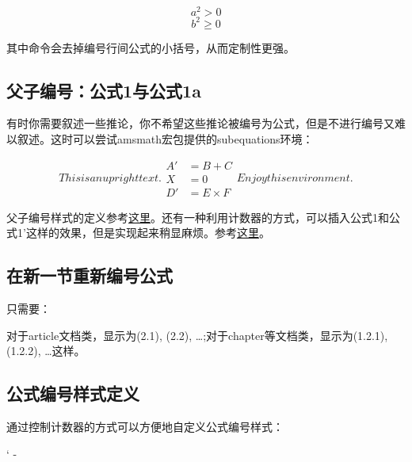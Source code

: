 \begin{codeshow}
\[a^2>0 \tag{$\star$}\]
\begin{equation}
b^2 \geqslant 0
\tag*{[Axiom]}
\end{equation}
\end{codeshow}

其中\latexline{\\tag*}命令会去掉编号行间公式的小括号，从而定制性更强。

\subsection{父子编号：公式1与公式1a}
有时你需要叙述一些推论，你不希望这些推论被编号为公式，但是不进行编号又难以叙述。这时可以尝试amsmath宏包提供的subequations环境：

\begin{codeshow}
\begin{subequations}
This is an upright text.
\begin{align}
A' &=B+C \\
X &=0 \nonumber \\
D' &=E \times F
\end{align}
Enjoy this environment.
\end{subequations}
\end{codeshow}

父子编号样式的定义参考\hyperref[code:parenteqnum]{这里}。还有一种利用计数器的方式，可以插入公式1和公式1'这样的效果，但是实现起来稍显麻烦。参考\hyperref[code:eq1plus]{这里}。

\subsection{在新一节重新编号公式}
只需要：
\begin{latex}{}
\end{latex}

对于article文档类，显示为(2.1), (2.2), \ldots ;对于chapter等文档类，显示为(1.2.1), (1.2.2), \ldots 这样。

\subsection{公式编号样式定义}
通过控制计数器的方式可以方便地自定义公式编号样式：
\begin{latex}{}
\renewcommand{\theequation}{\thechapter-\roman{equation}}
\renewcommand{\theequation}`\label{code:parenteqnum}`
  {\theparentequation-}
\end{latex}

